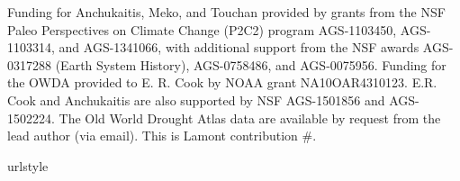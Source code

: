 \documentclass[draft,jgr]{AGUTeX}
\begin{document}
\begin{article}

\begin{acknowledgments}
Funding for Anchukaitis, Meko, and Touchan provided by grants from the NSF Paleo Perspectives on Climate Change (P2C2) program AGS-1103450, AGS-1103314, and AGS-1341066, with additional support from the NSF awards AGS-0317288 (Earth System History), AGS-0758486, and AGS-0075956. Funding for the OWDA provided to E. R. Cook by NOAA grant NA10OAR4310123.  E.R. Cook and Anchukaitis are also supported by NSF AGS-1501856 and AGS-1502224. The Old World Drought Atlas data are available by request from the lead author (via email). This is Lamont contribution \#.
\end{acknowledgments}











%
\begin{thebibliography}{74}
\providecommand{\natexlab}[1]{#1}
\expandafter\ifx\csname urlstyle\endcsname\relax
  \providecommand{\doi}[1]{doi:\discretionary{}{}{}#1}\else
  \providecommand{\doi}{doi:\discretionary{}{}{}\begingroup
  \urlstyle{rm}\Url}\fi


\end{thebibliography}
\end{article}
\end{document}
